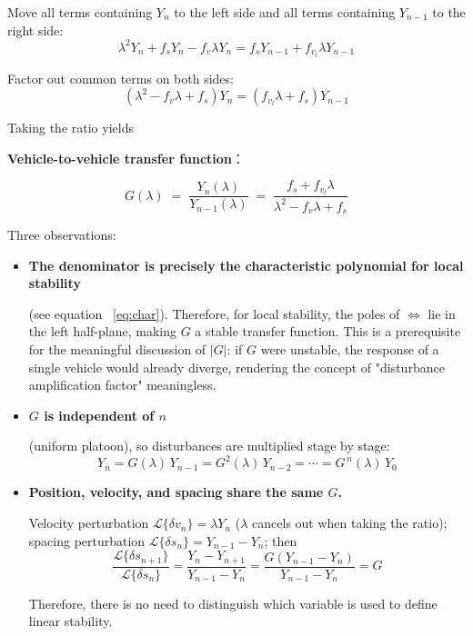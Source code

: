 \documentclass[11pt,a4paper,openany]{book}
\numberwithin{equation}{chapter}
\numberwithin{figure}{chapter}
\numberwithin{table}{chapter}
\begin{document}
Move all terms containing $Y_n$ to the left side and all terms containing $Y_{n-1}$ to the right side:
\begin{equation}
\lambda^2 Y_n + f_s Y_n - f_v\lambda Y_n = f_s Y_{n-1} + f_{v_l}\lambda Y_{n-1}
\end{equation}

Factor out common terms on both sides:
\begin{equation}
\left(\lambda^2 - f_v\lambda + f_s\right) Y_n = \left(f_{v_l}\lambda + f_s\right) Y_{n-1}
\end{equation}

Taking the ratio yields

\textbf{Vehicle-to-vehicle transfer function}：
\begin{tcolorbox}[keybox,title=\textbf{Vehicle-to-vehicle transfer function}]
\begin{equation}
G(\lambda) \;=\; \frac{Y_n(\lambda)}{Y_{n-1}(\lambda)}
\;=\; \frac{f_s + f_{v_l}\lambda}{\lambda^2 - f_v\lambda + f_s}
\label{eq:G0}
\end{equation}
\end{tcolorbox}



Three observations:



\begin{itemize}[leftmargin=1.4em,itemsep=3pt]
\item \textbf{The denominator is precisely the characteristic polynomial for local stability}

(see equation ~\eqref{eq:char}). Therefore, for local stability, the poles of $\iff$ lie in the left half-plane, making $G$ a stable transfer function. This is a prerequisite for the meaningful discussion of $\left|G\right|$: if $G$ were unstable, the response of a single vehicle would already diverge, rendering the concept of "disturbance amplification factor" meaningless.


\item \textbf{$G$ is independent of $n$}

(uniform platoon), so disturbances are multiplied stage by stage:
\begin{equation}
Y_n = G(\lambda)\,Y_{n-1} = G^2(\lambda)\,Y_{n-2} = \cdots = G^{\,n}(\lambda)\,Y_0
\end{equation}\item \textbf{Position, velocity, and spacing share the same $G$.}

Velocity perturbation $\mathcal{L}\{\delta v_n\} = \lambda Y_n$ ($\lambda$ cancels out when taking the ratio); spacing perturbation $\mathcal{L}\{\delta s_n\} = Y_{n-1}-Y_n$; then
\[
\frac{\mathcal{L}\{\delta s_{n+1}\}}{\mathcal{L}\{\delta s_n\}}
= \frac{Y_n - Y_{n+1}}{Y_{n-1}-Y_n}
= \frac{G\left(Y_{n-1}-Y_n\right)}{Y_{n-1}-Y_n} = G
\]





Therefore, there is no need to distinguish which variable is used to define linear stability.







\end{itemize}
\end{document}
